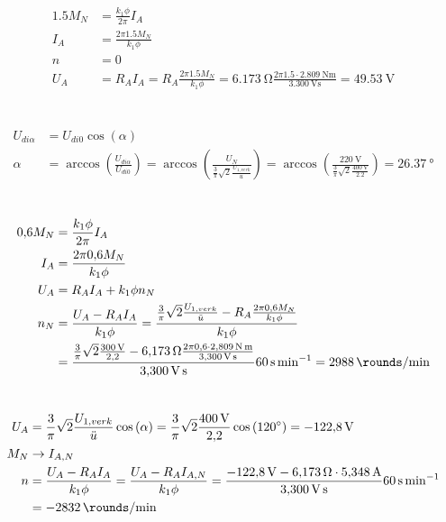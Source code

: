 \documentclass[11pt,a4paper]{scrartcl}
\newcommand{\mybr}[1]{\left(#1\right)}
\newcommand{\0}{_{\mybr{0}}}
\newcommand{\1}{_{\mybr{1}}}
\newcommand{\2}{_{\mybr{2}}}
\begin{document}
\section{}
\begin{align}
\num{1.5}M_N&=\frac{k_1\phi}{2\pi}I_A\\
I_A&=\frac{2\pi\num{1.5}M_N}{k_1\phi}\\
n&=0\\
U_A&=R_A I_A=R_A \frac{2\pi\num{1.5}M_N}{k_1\phi}=\SI{6.173}{\ohm}\frac{2\pi\num{1.5}\cdot\SI{2.809}{\newton\metre}}{\SI{3.300}{\volt\second}}=\SI{49.53}{\volt}
\end{align}

\section{}
\begin{align}
U_{di\alpha}&=U_{di0}\cos\mybr{\alpha}\\
\alpha&=\arccos\mybr{\frac{U_{di\alpha}}{U_{di0}}}=\arccos\mybr{\frac{U_N}{\frac{3}{\pi}\sqrt{2}\frac{U_{1,verk}}{\ddot{u}}}}=\arccos\mybr{\frac{\SI{220}{\volt}}{\frac{3}{\pi}\sqrt{2}\frac{\SI{400}{\volt}}{\num{2.2}}}}=\SI{26.37}{\degree}
\end{align}

\section{}
\begin{align}
\num{0.6}M_N&=\frac{k_1\phi}{2\pi}I_A\\
I_A&=\frac{2\pi\num{0.6}M_N}{k_1\phi}\\
U_A&=R_A I_A + k_1\phi n_N\\
n_N&=\frac{U_A-R_A I_A}{k_1\phi}=\frac{\frac{3}{\pi}\sqrt{2}\frac{U_{1,verk}}{\ddot{u}}-R_A\frac{2\pi\num{0.6}M_N}{k_1\phi}}{k_1\phi}\\
&=\frac{\frac{3}{\pi}\sqrt{2}\frac{\SI{300}{\volt}}{\num{2.2}}-\SI{6.173}{\ohm}\frac{2\pi\num{0.6}\cdot\SI{2.809}{\newton\metre}}{\SI{3.300}{\volt\second}}}{\SI{3.300}{\volt\second}}\SI{60}{\second\per\minute}=\SI{2988}{\rounds\per\minute}
\end{align}

\section{}
\begin{align}
U_A&=\frac{3}{\pi}\sqrt{2}\frac{U_{1,verk}}{\ddot{u}}\cos\mybr{\alpha}=\frac{3}{\pi}\sqrt{2}\frac{\SI{400}{\volt}}{\num{2.2}}\cos\mybr{\SI{120}{\degree}}=\SI{-122.8}{\volt}\\
M_N&\rightarrow I_{A,N}\\
n&=\frac{U_A-R_A I_A}{k_1\phi}=\frac{U_A-R_A I_{A,N}}{k_1\phi}=\frac{\SI{-122.8}{\volt}-\SI{6.173}{\ohm}\cdot\SI{5.348}{\ampere}}{\SI{3.300}{\volt\second}}\SI{60}{\second\per\minute}\\
&=\SI{-2832}{\rounds\per\minute}
\end{align}
\end{document}
